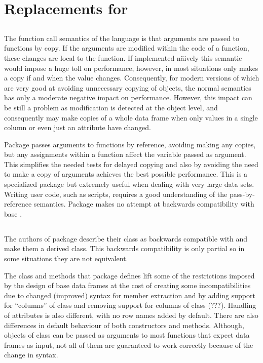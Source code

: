 \documentclass[krantz2]{krantz}\usepackage{knitr}%
\begin{document}
\section[Replacements for \texttt{data.frame}]{Replacements for }
\subsection{}
The function call semantics of the \Rlang language is that arguments are passed to functions by copy. If the arguments are modified within the code of a function, these changes are local to the function. If implemented näively this semantic would impose a huge toll on performance, however, \Rlang in most situations only makes a copy if and when the value changes. Consequently, for modern versions of \Rlang which are very good at avoiding unnecessary copying of objects, the normal \Rlang semantics has only a moderate negative impact on performance. However, this impact can be still a problem as modification is detected at the object level, and consequently \Rlang may make copies of a whole data frame when only values in a single column or even just an attribute have changed.

Package  passes arguments to functions by reference, avoiding making any copies, but any assignments within a function affect the variable passed as argument. This simplifies the needed tests for delayed copying and also by avoiding the need to make a copy of arguments achieves the best possible performance. This is a specialized package but extremely useful when dealing with very large data sets. Writing user code, such as scripts, requires a good understanding of the pass-by-reference semantics. Package  makes no attempt at backwards compatibility with base \Rlang {}.

\subsection{}\label{sec:data:tibble}

The authors of package  describe their  class as backwards compatible with  and make them a derived class. This backwards compatibility is only partial so in some situations they are not equivalent.

The class and methods that package  defines lift some of the restrictions imposed by the design of base \Rlang data frames at the cost of creating some incompatibilities due to changed (improved) syntax for member extraction and by adding support for ``columns'' of class  and removing support for columns of class  (???). Handling of attributes is also different, with no row names added by default. There are also differences in default behaviour of both constructors and methods. Although, objects of class  can be passed as arguments to most functions that expect data frames as input, not all of them are guaranteed to work correctly because of the change in syntax.
\end{document}
